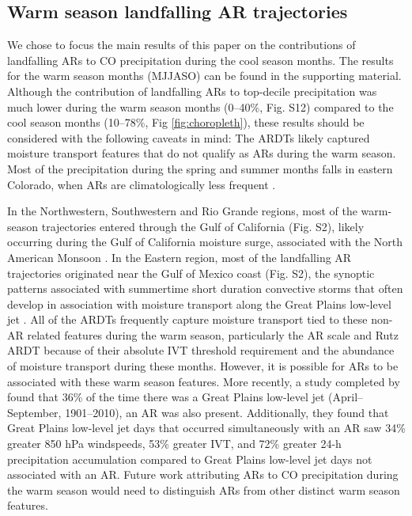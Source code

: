 \documentclass[draft]{agujournal2019}
\begin{document}
\subsection{Warm season landfalling AR trajectories}
\label{sec:results:warm-season}

We chose to focus the main results of this paper on the contributions of landfalling ARs to CO precipitation during the cool season months. The results for the warm season months (MJJASO) can be found in the supporting material. Although the contribution of landfalling ARs to top-decile precipitation was much lower during the warm season months (0--40\%, Fig. S12) compared to the cool season months (10--78\%, Fig \ref{fig:choropleth}), these results should be considered with the following caveats in mind: The ARDTs likely captured moisture transport features that do not qualify as ARs during the warm season. Most of the precipitation during the spring and summer months falls in eastern Colorado, when ARs are climatologically less frequent \cite{Doesken1984Period., Guan2015, Harvey2019CitizensFrom}.

In the Northwestern, Southwestern and Rio Grande regions, most of the warm-season trajectories entered through the Gulf of California (Fig. S2), likely occurring during the Gulf of California moisture surge, associated with the North American Monsoon \cite{Higgins2004RelationshipsStates, https://doi.org/10.1029/2017JD027652}. In the Eastern region, most of the landfalling AR trajectories originated near the Gulf of Mexico coast (Fig. S2), the synoptic patterns associated with summertime short duration convective storms that often develop in association with moisture transport along the Great Plains low-level jet \cite{Helfand1995ClimatologyStates, Pu2016DynamicalPrecipitation,  Schubert1998SubseasonalStates, Weaver2008VariabilityImpacts}. All of the ARDTs frequently capture moisture transport tied to these non-AR related features during the warm season, particularly the AR scale and Rutz ARDT because of their absolute IVT threshold requirement and the abundance of moisture transport during these months. However, it is possible for ARs to be associated with these warm season features. More recently, a study completed by  found that 36\% of the time there was a Great Plains low-level jet (April--September, 1901--2010), an AR was also present. Additionally, they found that Great Plains low-level jet days that occurred simultaneously with an AR saw 34\% greater 850 hPa windspeeds, 53\% greater IVT, and 72\% greater 24-h precipitation accumulation compared to Great Plains low-level jet days not associated with an AR. Future work attributing ARs to CO precipitation during the warm season would need to distinguish ARs from other distinct warm season features.
\end{document}

